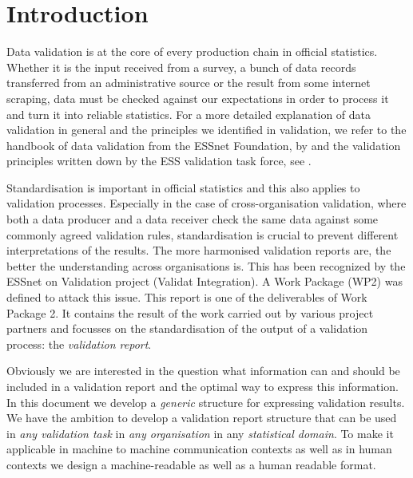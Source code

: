 \section{Introduction}
\label{sect:introduction}

Data validation is at the core of every production chain in official
statistics.  Whether it is the input received from a survey, a bunch of data
records transferred from an administrative source or the result from some
internet scraping, data must be checked against our expectations in order to
process it and turn it into reliable statistics.  For a more detailed
explanation of data validation in general and the principles we identified in
validation, we refer to the handbook of data validation from the ESSnet
Foundation, by \citet{zio2015methodology} and the validation principles written down
by the ESS validation task force, see \citet[Chapter 4]{ess2017}.

Standardisation is important in official statistics and this also applies to
validation processes.  Especially in the case of cross-organisation validation,
where both a data producer and a data receiver check the same data against some
commonly agreed validation rules, standardisation is crucial to prevent
different interpretations of the results.  The more harmonised validation
reports are, the better the understanding across organisations is.  This has
been recognized by the ESSnet on Validation project (Validat Integration).  A
Work Package (WP2) was defined to attack this issue.  This report is one of the
deliverables of Work Package 2.  It contains the result of the work carried out
by various project partners and focusses on the standardisation of the output
of a validation process: the \emph{validation report}.

Obviously we are interested in the question what information can and should be
included in a validation report and the optimal way to express this
information.  In this document we develop a \emph{generic} structure for
expressing validation results.  We have the ambition to develop a validation
report structure that can be used in \emph{any validation task} in \emph{any
organisation} in any \emph{statistical domain}.  To make it applicable in
machine to machine communication contexts as well as in human contexts we
design a machine-readable as well as a human readable format.

